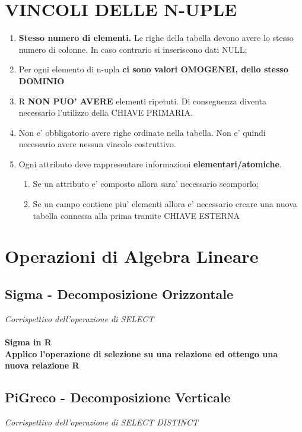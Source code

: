 \documentclass[a4paper, 12pt]{report}
\begin{document}
    \section{VINCOLI DELLE N-UPLE}
    \begin{enumerate}
        \item \textbf{Stesso numero di elementi.} Le righe della tabella devono avere lo stesso numero di colonne. In caso contrario si inseriscono dati NULL;
        \item Per ogni elemento di n-upla \textbf{ci sono valori OMOGENEI, dello stesso DOMINIO}
        \item R \textbf{ NON PUO' AVERE} elementi ripetuti. Di conseguenza diventa necessario l'utilizzo della CHIAVE PRIMARIA. 
        \item Non e' obbligatorio avere righe ordinate nella tabella. Non e' quindi necessario avere nessun vincolo costruttivo.
        \item Ogni attributo deve rappresentare informazioni \textbf{elementari/atomiche}. \newline
        \begin{enumerate}
            \item Se un attributo e' composto allora sara' necessario scomporlo;
            \item Se un campo contiene piu' elementi allora e' necessario creare una nuova tabella connessa alla prima tramite CHIAVE ESTERNA
        \end{enumerate}
    \end{enumerate}
    
   \section{Operazioni di Algebra Lineare}
   \subsection{Sigma - Decomposizione Orizzontale}
   \textit{Corrispettivo dell'operazione di SELECT}
   \paragraph{Sigma in R \\ Applico l'operazione di selezione su una relazione ed ottengo una nuova relazione R}

   \subsection{PiGreco - Decomposizione Verticale}
   \textit{Corrispettivo dell'operazione di SELECT DISTINCT}
\end{document}
